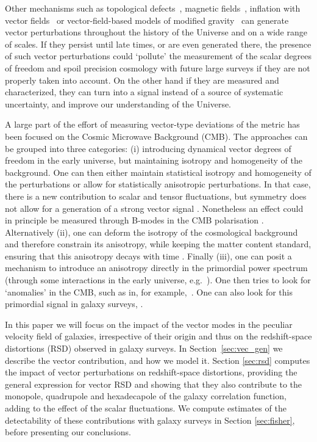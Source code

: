 \documentclass[a4paper,twocolumn,aps,prd,nolongbibliography,superscriptaddress,showpacs,showkeys,amsmath,amssymb,floatfix,nofootinbib]{revtex4-1}
\renewcommand{\[}{\begin{equation}}
\renewcommand{\]}{\end{equation}}
\begin{document}
Other mechanisms such as topological defects~\cite{Durrer:2001cg,Daverio:2015nva,Lizarraga:2016onn}, magnetic fields~\cite{Durrer:1998ya}, inflation with vector fields~\cite{Ford:1989me,Golovnev:2008cf} or vector-field-based models of modified gravity~\cite{Jacobson:2000xp,Zlosnik:2006zu,Heisenberg:2014rta,Tasinato:2014eka} can generate vector perturbations throughout the history of the Universe and on a wide range of scales.  If they persist until late times, or are even generated there, the presence of such vector perturbations could `pollute' the measurement of the scalar degrees of freedom and spoil precision cosmology with future large surveys if they are not properly taken into account. On the other hand if they are measured and characterized, they can turn into a signal instead of a source of systematic uncertainty, and improve our understanding of the Universe.

A large part of the effort of measuring vector-type deviations of the metric has been focused on the Cosmic Microwave Background (CMB). The approaches can be grouped into three categories: (i) introducing dynamical vector degrees of freedom in the early universe, but maintaining isotropy and homogeneity of the background. One can then either maintain statistical isotropy and homogeneity of the perturbations or allow for statistically anisotropic perturbations. In that case, there is a new contribution to scalar and tensor fluctuations, but symmetry does not allow for a generation of a strong vector signal \cite{Lim:2004js}. Nonetheless an effect could in principle be measured through B-modes in the CMB polarisation \cite{Nakashima:2011fu}. Alternatively (ii), one can deform the isotropy of the cosmological background and therefore constrain its anisotropy, while keeping the matter content standard, ensuring that this anisotropy decays with time \cite{Saadeh:2016bmp}. Finally (iii), one can posit a mechanism to introduce an anisotropy directly in the primordial power spectrum (through some interactions in the early universe, e.g.\ \cite{Ackerman:2007nb}). One then tries to look for `anomalies' in the CMB, such as in, for example,~\cite{Ade:2015hxq}. One can also look for this primordial signal in galaxy surveys, \cite{2010JCAP...05..027P,Jeong:2012df,Shiraishi:2016wec,Sugiyama:2017ggb}.

In this paper we will focus on the impact of the vector modes in the peculiar velocity field of galaxies, irrespective of their origin and thus on the redshift-space distortions (RSD) observed in galaxy surveys. In Section~\ref{sec:vec_gen} we describe the vector contribution, and how we model it. Section \ref{sec:rsd} computes the impact of vector perturbations on redshift-space distortions, providing the general expression for vector RSD and showing that they  also contribute to the monopole, quadrupole and hexadecapole of the galaxy correlation function, adding to the effect of the scalar fluctuations. We compute estimates of the detectability of these contributions with galaxy surveys in Section \ref{sec:fisher}, before presenting our conclusions.
\end{document}
